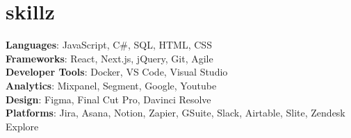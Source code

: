 
\section{skillz}

\begin{itemize}[leftmargin=0.15in, label={}]
    \small{
      \item{
      \textbf{Languages}{: JavaScript, C\#, SQL, HTML, CSS} \\
      \textbf{Frameworks}{: React, Next.js, jQuery, Git, Agile} \\
      \textbf{Developer Tools}{: Docker, VS Code, Visual Studio} \\
      \textbf{Analytics}{: Mixpanel, Segment, Google, Youtube} \\
      \textbf{Design}{: Figma, Final Cut Pro, Davinci Resolve} \\
      \textbf{Platforms}{: Jira, Asana, Notion, Zapier, GSuite, Slack, Airtable, Slite, Zendesk Explore} \\
      }
    }
  \end{itemize}